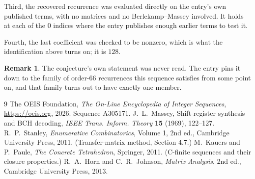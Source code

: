 \documentclass[11pt,a4paper]{article}
\theoremstyle{plain}
\theoremstyle{definition}
\newtheorem{remark}[theorem]{Remark}
\begin{document}
Third, the recovered recurrence was evaluated directly on the entry's own published terms, with
no matrices and no Berlekamp--Massey involved. It holds at each of the $0$ indices where
the entry publishes enough earlier terms to test it.

Fourth, the last coefficient was checked to be nonzero, which is what the identification above
turns on; it is $128$.

\begin{remark}
The conjecture's own statement was never read. The entry pins it down to the family of
order-$66$ recurrences this sequence satisfies from some point on, and that family turns
out to have exactly one member.
\end{remark}

\begin{thebibliography}{9}
 The OEIS Foundation, \emph{The On-Line Encyclopedia of Integer
Sequences}, \url{https://oeis.org}, 2026. Sequence A305171.
 J.~L.~Massey, Shift-register synthesis and BCH decoding, \emph{IEEE
Trans. Inform. Theory} \textbf{15} (1969), 122--127.
 R.~P.~Stanley, \emph{Enumerative Combinatorics}, Volume 1, 2nd ed.,
Cambridge University Press, 2011. (Transfer-matrix method, Section 4.7.)
 M.~Kauers and P.~Paule, \emph{The Concrete Tetrahedron}, Springer, 2011.
(C-finite sequences and their closure properties.)
 R.~A.~Horn and C.~R.~Johnson, \emph{Matrix Analysis}, 2nd ed., Cambridge
University Press, 2013.
\end{thebibliography}
\end{document}
